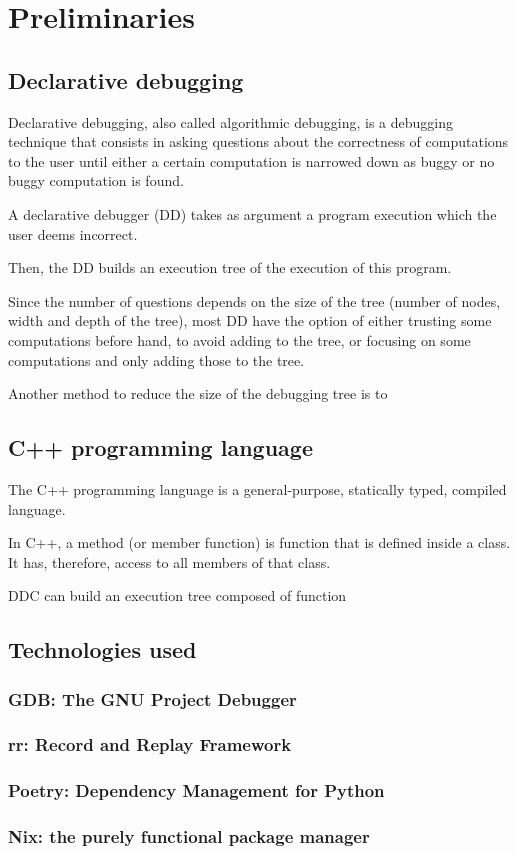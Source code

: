 \chapter{Preliminaries}
\label{cap:preliminares}

\section{Declarative debugging}
Declarative debugging, also called algorithmic debugging, is a debugging technique that consists in asking questions about the correctness of computations to the user until either a certain computation is narrowed down as buggy or no buggy computation is found.

A declarative debugger (DD) takes as argument a program execution which the user deems incorrect.

Then, the DD builds an execution tree of the execution of this program.

Since the number of questions depends on the size of the tree (number of nodes, width and depth of the tree), most DD have the option of either trusting some computations before hand, to avoid adding to the tree, or focusing on some computations and only adding those to the tree.

Another method to reduce the size of the debugging tree is to 
\section{C++ programming language}
The C++ programming language is a general-purpose, statically typed, compiled language.

In C++, a method (or member function) is function that is defined inside a class. It has, therefore, access to all members of that class.

DDC can build an execution tree composed of function
\section{Technologies used}
\subsection{GDB: The GNU Project Debugger}
\subsection{rr: Record and Replay Framework}
\subsection{Poetry: Dependency Management for Python}
\subsection{Nix: the purely functional package manager}
